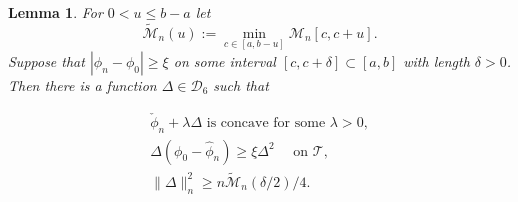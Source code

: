 \documentclass{article} %
\newtheorem{lemma}[theorem]{Lemma}
\begin{document}
\begin{lemma}\label{Dumbgen_2:improve}
For $0<u \leq b-a$ let
$$
\widetilde{\mathscr{M}}_n(u):=\min _{c \in[a, b-u]} \mathscr{M}_n[c, c+u].
$$
Suppose that $|\widehat{\phi}_n-\phi_0 | \geq \xi$ on some interval $[c, c+\delta] \subset[a, b]$ with length $\delta>0$. Then there is a function $\Delta \in \mathcal{D}_6$ such that

\begin{align}\label{conditions:improve}
\check{\phi}_n+\lambda \Delta \text { is concave for some } \lambda>0, \nonumber \\
\Delta(\phi_0-{\widehat{\phi}}_n) \geq \xi \Delta^2 \quad \text { on } \mathscr{T} ,\nonumber \\
\|\Delta\|_n^2 \geq n \widetilde{\mathscr{M}}_n(\delta / 2) / 4.
\end{align}
\end{lemma}


\end{document}
